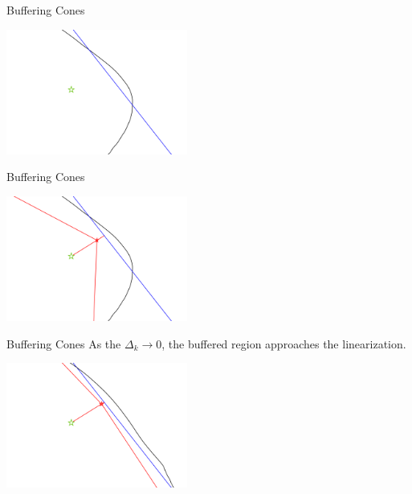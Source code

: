 \documentclass{beamer}
\newcommand{\dk}{{\Delta_k}}
\begin{document}

\begin{frame}{Buffering Cones}
	\begin{center}
		\includegraphics[width=225px]{images/explanation_1.png}
	\end{center}
\end{frame}


\begin{frame}{Buffering Cones}
	\begin{center}
		\includegraphics[width=225px]{images/explanation_2.png}
	\end{center}
\end{frame}


\begin{frame}{Buffering Cones}
	As the $\dk \to 0$, the buffered region approaches the linearization.
	\begin{center}
		\includegraphics[width=225px]{images/explanation_3.png}
	\end{center}
\end{frame}
\end{document}
